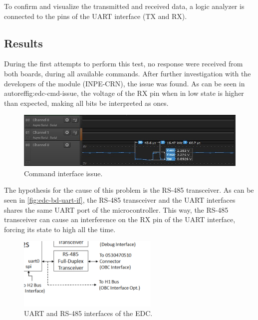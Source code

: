 To confirm and visualize the transmitted and received data, a logic analyzer is connected to the pins of the UART interface (TX and RX).

\subsection{Results}

During the first attempts to perform this test, no response were received from both boards, during all available commands. After further investigation with the developers of the module (INPE-CRN), the issue was found. As can be seen in autoref{fig:edc-cmd-issue}, the voltage of the RX pin when in low state is higher than expected, making all bits be interpreted as ones.

\begin{figure}[!ht]
    \begin{center}
        \includegraphics[width=\textwidth]{figures/edc_report/edc-cmd-issue}
        \caption{Command interface issue.}
        \label{fig:edc-cmd-issue}
    \end{center}
\end{figure}

The hypothesis for the cause of this problem is the RS-485 transceiver. As can be seen in \autoref{fig:edc-bd-uart-if}, the RS-485 transceiver and the UART interfaces shares the same UART port of the microcontroller. This way, the RS-485 transceiver can cause an interference on the RX pin of the UART interface, forcing its state to high all the time.

\begin{figure}[!ht]
    \begin{center}
        \includegraphics[width=0.6\textwidth]{figures/edc_report/edc-bd-uart-if}
        \caption{UART and RS-485 interfaces of the EDC.}
        \label{fig:edc-bd-uart-if}
    \end{center}
\end{figure}

